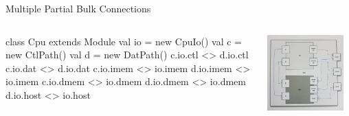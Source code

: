 \documentclass[xcolor=pdflatex,dvipsnames,table]{beamer}
\begin{document}
\begin{frame}[fragile]{Multiple Partial Bulk Connections}
\begin{columns}

\begin{scala}
class Cpu extends Module {
  val io = new CpuIo()
  val c  = new CtlPath()
  val d  = new DatPath()
  c.io.ctl  <> d.io.ctl
  c.io.dat  <> d.io.dat
  c.io.imem <> io.imem
  d.io.imem <> io.imem
  c.io.dmem <> io.dmem
  d.io.dmem <> io.dmem
  d.io.host <> io.host
}
\end{scala}


\begin{center}
\includegraphics[width=0.9\textwidth]{../tutfigs/cpu.png} 
\end{center}

\end{columns}
\end{frame}
\end{document}

